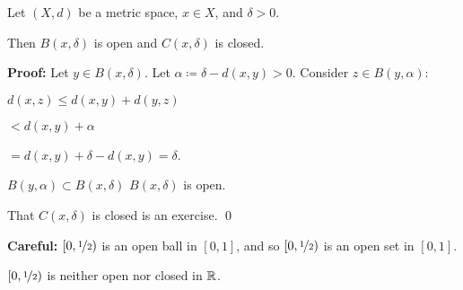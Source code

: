 \documentclass[10pt,aspectratio=149]{beamer}
\begin{document}
\begin{frame}

\begin{proposition}
Let $(X,d)$ be a metric space, $x \in X$, and $\delta > 0$.

\pause
Then
$B(x,\delta)$ is open and 
$C(x,\delta)$ is closed.
\end{proposition}

\pause
\textbf{Proof:}
Let $y \in B(x,\delta)$.
\pause
Let $\alpha \coloneqq \delta-d(x,y) > 0$.
\pause
Consider $z \in B(y,\alpha)$:

\pause
\medskip

$
d(x,z) \leq d(x,y) + d(y,z)
$

\pause
\medskip
\quad
$ < d(x,y) + \alpha$

\pause
\medskip
\quad
$= d(x,y) + \delta-d(x,y) = \delta$.

\pause
\vspace*{-0.7in}
\hspace*{2.9in}

\vspace*{-0.3in}

\pause
\thus \quad
$B(y,\alpha) \subset B(x,\delta)$ \wthus
$B(x,\delta)$ is open.


\pause
\medskip

That $C(x,\delta)$ is closed is an exercise.
\qed

\pause
\medskip

\textbf{Careful:}
$[0,\nicefrac{1}{2})$ is
an open ball in $[0,1]$, and so $[0,\nicefrac{1}{2})$ is
an open set in $[0,1]$.

\pause
$[0,\nicefrac{1}{2})$ is neither open nor closed in ${\mathbb{R}}$.

\end{frame}
\end{document}
